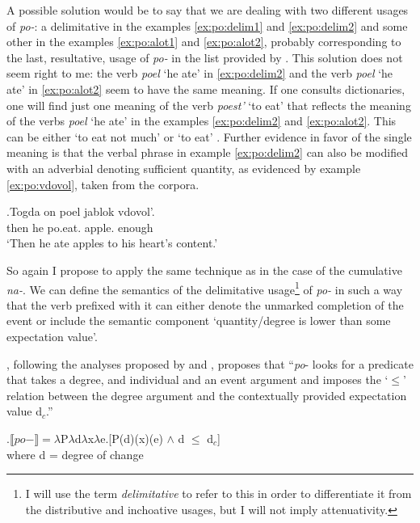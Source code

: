 A possible solution would be to say that we are dealing with two different usages of \textit{po-}: a delimitative in the examples \ref{ex:po:delim1} and \ref{ex:po:delim2} and some other in the examples \ref{ex:po:alot1} and \ref{ex:po:alot2}, probably corresponding to the last, resultative, usage of \textit{po-} in the list provided by \citet{Shvedova:82}. This solution does not seem right to me: the verb \textit{poel} `he ate' in \ref{ex:po:delim2} and the verb \textit{poel} `he ate' in \ref{ex:po:alot2} seem to have the same meaning. If one consults dictionaries, one will find just one meaning of the verb \textit{poest'} `to eat' that reflects the meaning of the verbs \textit{poel} `he ate' in the examples \ref{ex:po:delim2} and \ref{ex:po:alot2}. This can be either `to eat not much' \citep{Ushakov:50} or `to eat' \citep{Efremova:00}. Further evidence in favor of the single meaning is that the verbal phrase in example \ref{ex:po:delim2} can also be modified with an adverbial denoting sufficient quantity, as evidenced by example \ref{ex:po:vdovol}, taken from the corpora.

\exg.\label{ex:po:vdovol}Togda on poel jablok vdovol'.\\
then he po.eat. apple. enough\\
\trans `Then he ate apples to his heart's content.'\\

So again I propose to apply the same technique as in the case of the cumulative \textit{na-}. We can define the semantics of the delimitative usage\footnote{I will use the term \textit{delimitative} to refer to this in order to differentiate it from the distributive and inchoative usages, but I will not imply attenuativity.} of \textit{po-} in such a way that the verb prefixed with it can either denote the unmarked completion of the event or include the semantic component `quantity/degree is lower than some expectation value'. 

\citet[48]{Kagan:book}, following the analyses proposed by \citet{Filip:00} and \citet{Souchkova:04}, proposes that ``\textit{po}- looks for a predicate that takes a degree, and individual and an event argument and imposes the `$\leqslant$' relation between the degree argument and the contextually provided expectation value d$_c$.''

\ex.\label{Kagan:po}$\llbracket po- \rrbracket = \lambda$P$\lambda$d$\lambda$x$\lambda$e.[P(d)(x)(e) $\wedge$ d $\leqslant$ d$_c$]\\
where d = degree of change \citep{KennedyLevin:02}

